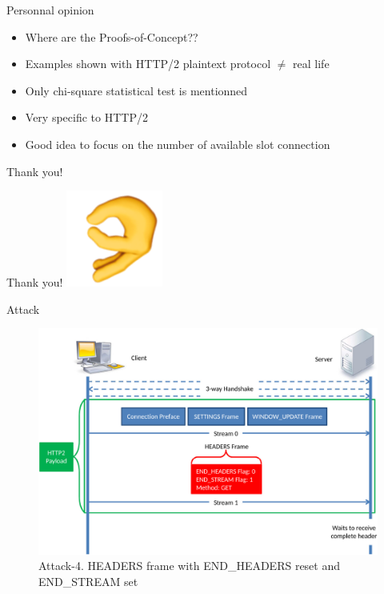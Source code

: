 \documentclass{beamer}
\begin{document}
\begin{frame}{Personnal opinion}
\begin{itemize}
	\item Where are the Proofs-of-Concept??
	\item Examples shown with HTTP/2 plaintext protocol $\ne$ real life
	\item Only chi-square statistical test is mentionned
	\item Very specific to HTTP/2
	\item Good idea to focus on the number of available slot connection
\end{itemize}
\end{frame}

\begin{frame}[standout]
	Thank you! 
\end{frame}
\begin{frame}[standout]
	Thank you! 
	\includegraphics[scale=0.3]{images/ok-hand.png}
\end{frame}

\appendix

\begin{frame}{Attack }
  \begin{figure}[t]
    \includegraphics[scale=0.22]{images/attack4.png}
    \caption{Attack-4. HEADERS frame with END\_HEADERS reset and END\_STREAM set}
  \end{figure}
\end{frame}
\end{document}
